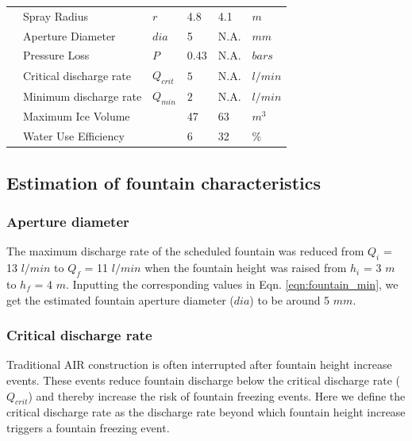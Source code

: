 \documentclass[tc, manuscript]{copernicus}
\begin{document}
\begin{table}
\begin{tabular}{@{}|llllll|@{}}
                           & Spray Radius                    &  $r$            & 4.8           & 4.1           & $m$ \\
		\multicolumn{1}{|l|}{} & Aperture Diameter               &  $dia$          & 5             & N.A.        & $mm$ \\
		\multicolumn{1}{|l|}{} & Pressure Loss                   &  $P$            & 0.43          & N.A.         & $bars$ \\
		\multicolumn{1}{|l|}{} & Critical discharge rate         &  $Q_{crit}$     & $5$           & N.A.         & $l/min$ \\
		\multicolumn{1}{|l|}{} & Minimum discharge rate          &  $Q_{min}$      & $2$           & N.A.          & $l/min$ \\\midrule
		\multicolumn{1}{|l|}{\multirow{2}{*}{\rotatebox[origin=c]{90}{AIR}}}

		                       & Maximum Ice Volume              &                 & 47            & 63            & $m^{3}$ \\
		\multicolumn{1}{|l|}{} & Water Use Efficiency            &                 & 6             & 32            & \% \\\midrule
	\end{tabular}
\end{table}

\subsection{Estimation of fountain characteristics}

\subsubsection{Aperture diameter}

The maximum discharge rate of the scheduled fountain was reduced from $Q_i$ =  13 $l/min$ to $Q_f$ = 11 $l/min$
when the fountain height was raised from  $h_i$ = 3 $m$ to $h_f$ = 4 $m$. Inputting the corresponding values in
Eqn. \ref{eqn:fountain_min}, we get the estimated fountain aperture diameter ($dia$) to be around 5 $mm$. 

\subsubsection{Critical discharge rate}

Traditional AIR construction is often interrupted after fountain height increase events. These events reduce
fountain discharge below the critical discharge rate ($Q_{crit}$) and thereby increase the risk of fountain
freezing events. Here we define the critical discharge rate as the discharge rate beyond which fountain height
increase triggers a fountain freezing event.
\end{document}
